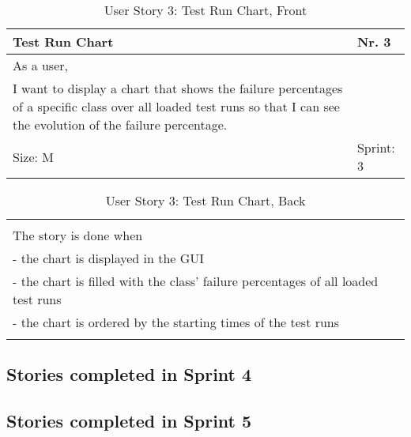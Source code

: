 \begin{table}[H]
  \caption{User Story 3: Test Run Chart, Front}
  \label{Story_3_Front}
  \centering
  \begin{tabular}{|p{9cm} p{2cm}|}
	\hline  	
  	Test Run Chart & Nr. 3 \\ 
  	\hline
  	As a user, &    \\ 
  	I want to display a chart that shows the failure percentages of a specific class over all loaded test runs so that I can see the evolution of the failure percentage. &    \\ 
  	Size: M & Sprint: 3 \\ 
  	\hline
  \end{tabular}
\end{table}
\begin{table}[H]
  \caption{User Story 3: Test Run Chart, Back}
  \label{Story_3_Back}
  \centering
  \begin{tabular}{|p{10cm} p{1cm}|}
  \hline
  	  &    \\ 
  	The story is done when &    \\ 
  	 - the chart is displayed in the GUI & \\ 
  	 - the chart is filled with the class' failure percentages of all loaded test runs & \\ 
  	 - the chart is ordered by the starting times of the test runs & \\ 

  	 
  	  &  
  	   \\ 
  	\hline
  \end{tabular}
\end{table}

\subsection*{Stories completed in Sprint 4}


\subsection*{Stories completed in Sprint 5}


